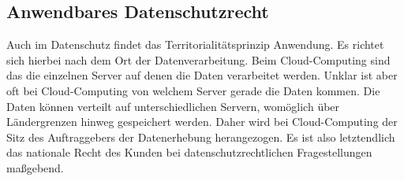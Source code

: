     \subsection{Anwendbares Datenschutzrecht}
Auch im Datenschutz findet das Territorialit\"atsprinzip Anwendung. Es richtet sich hierbei nach dem Ort der Datenverarbeitung. Beim Cloud-Computing sind das die einzelnen Server auf denen die Daten verarbeitet werden. Unklar ist aber oft bei Cloud-Computing von welchem Server gerade die Daten kommen. Die Daten k\"onnen verteilt auf unterschiedlichen Servern, wom\"oglich \"uber L\"andergrenzen hinweg gespeichert werden. Daher wird bei Cloud-Computing der Sitz des Auftraggebers der Datenerhebung herangezogen. Es ist also letztendlich das nationale Recht des Kunden bei datenschutzrechtlichen Fragestellungen ma{\ss}gebend.

